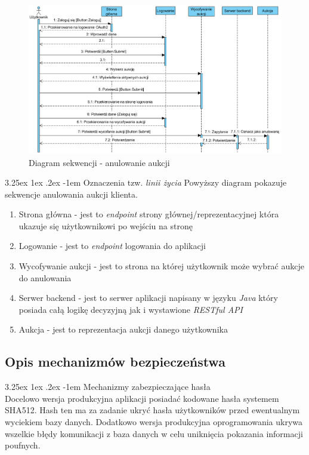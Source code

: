 \documentclass[10pt,titlepage]{article} %
\makeatletter
\renewcommand{\normalsize}{\fontsize{8pt}{10pt}\selectfont} %
\renewcommand\paragraph{\@startsection{paragraph}{5}{\z@}%
  {3.25ex \@plus1ex \@minus.2ex}%
  {-1em}%
  {\normalfont\normalsize\bfseries}}
\makeatother
\begin{document}
\begin{figure}[H]
\includegraphics[width=\textwidth]{img/sekcja2/wycofajAukcjeSD}
\caption[Diagram sekwencji - anulowanie aukcji]{Diagram sekwencji - anulowanie aukcji}
\end{figure}
\paragraph{Oznaczenia tzw. \textit{linii życia}}
Powyższy diagram pokazuje sekwencje anulowania aukcji klienta.
\begin{enumerate}[1.]
\item Strona główna - jest to \textit{endpoint} strony głównej/reprezentacyjnej która ukazuje się użytkownikowi po wejściu na stronę
\item Logowanie - jest to \textit{endpoint} logowania do aplikacji
\item Wycofywanie aukcji - jest to strona na której użytkownik może wybrać aukcje do anulowania
\item Serwer backend - jest to serwer aplikacji napisany w języku \textit{Java} który posiada całą logikę decyzyjną jak i wystawione \textit{RESTful API}
\item Aukcja - jest to reprezentacja aukcji danego użytkownika
\end{enumerate}


\subsection{Opis mechanizmów bezpieczeństwa}
\paragraph{Mechanizmy zabezpieczające hasła}\mbox{}\\
Docelowo wersja produkcyjna aplikacji posiadać kodowane hasła systemem SHA512. Hash ten ma za zadanie ukryć hasła użytkowników przed ewentualnym wyciekiem bazy danych.
Dodatkowo wersja produkcyjna oprogramowania ukrywa wszelkie błędy komunikacji z baza danych w celu uniknięcia pokazania informacji poufnych.
\end{document}
